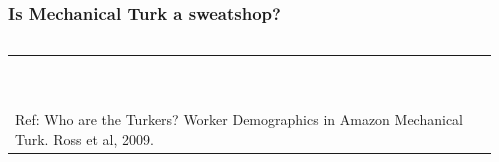 \documentclass[10pt]{beamer}
\begin{document}
\begin{frame}
  \frametitle{Is Mechanical Turk a sweatshop?}
\begin{columns}[T]
\begin{column}{5cm}

\begin{footnotesize}
\begin{tabular}{p{4cm}}
\\ \\ \\ \\ \\ \\ \\ \\ \\ \\ \\
 Ref: Who are the Turkers? Worker Demographics in Amazon Mechanical Turk. Ross et al, 2009.
\end{tabular} 
\end{footnotesize}
\end{column}
\begin{column}{5cm}
\end{column}
\end{columns}
\end{frame}
\end{document}
